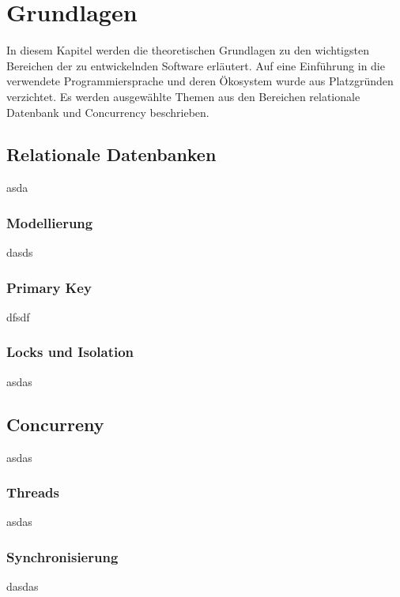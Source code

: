 \chapter{Grundlagen}\label{chap:Grundlagen}
\chapterstart
In diesem Kapitel werden die theoretischen Grundlagen zu den wichtigsten Bereichen der zu entwickelnden Software erläutert. Auf eine Einführung in die verwendete Programmiersprache und deren Ökosystem wurde aus Platzgründen verzichtet. Es werden ausgewählte Themen aus den Bereichen relationale Datenbank und Concurrency beschrieben.
\section{Relationale Datenbanken}
asda
\subsection{Modellierung}
dasds
\subsection{Primary Key}
dfsdf
\subsection{Locks und Isolation}
asdas
\section{Concurreny}
asdas
\subsection{Threads}
asdas
\subsection{Synchronisierung}
dasdas
\chapterend
